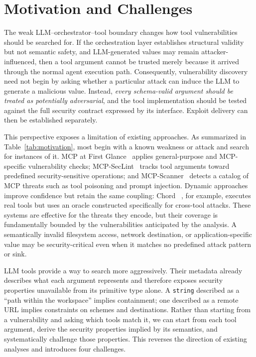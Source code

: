 

\section{Motivation and Challenges}
\label{sec:moti}


The weak LLM--orchestrator--tool boundary changes how tool vulnerabilities
should be searched for. If the orchestration layer establishes structural
validity but not semantic safety, and LLM-generated values may remain
attacker-influenced, then a tool argument cannot be trusted merely because it
arrived through the normal agent execution path. Consequently, vulnerability
discovery need not begin by asking whether a particular attack can induce the
LLM to generate a malicious value. Instead, \emph{every schema-valid argument
should be treated as potentially adversarial}, and the tool implementation
should be tested against the full security contract expressed by its
interface. Exploit delivery can then be established separately.

This perspective exposes a limitation of existing approaches. As summarized
in Table~\ref{tab:motivation}, most begin with a known weakness or attack and
search for instances of it. MCP at First Glance~\cite{mcp-first-glance}
applies general-purpose and MCP-specific vulnerability checks;
MCP-SecLint~\cite{mcp-seclint} tracks tool arguments toward predefined
security-sensitive operations; and MCP-Scanner~\cite{mcp-scanner} detects a
catalog of MCP threats such as tool poisoning and prompt injection. Dynamic
approaches improve confidence but retain the same coupling: Chord
~\cite{les-dissonances}, for example, executes real tools but uses an oracle
constructed specifically for cross-tool attacks. These systems are effective
for the threats they encode, but their coverage is fundamentally bounded by
the vulnerabilities anticipated by the analysis. A semantically invalid
filesystem access, network destination, or application-specific value may be
security-critical even when it matches no predefined attack pattern or sink.

LLM tools provide a way to search more aggressively. Their metadata already
describes what each argument represents and therefore exposes security
properties unavailable from its primitive type alone. A \texttt{string}
described as a ``path within the workspace'' implies containment; one
described as a remote URL implies constraints on schemes and destinations.
Rather than starting from a vulnerability and asking which tools match it, we
can start from each tool argument, derive the security properties implied by
its semantics, and systematically challenge those properties. This reverses
the direction of existing analyses and introduces four challenges.

